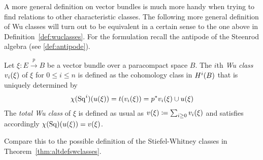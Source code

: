 A more general definition on vector bundles is much more handy when
trying to find relations to other characteristic classes.
The following more general definition of Wu classes
will turn out to be equivalent in a certain sense to the one above in
Definition~\autoref{def:wuclasses}.
For the formulation recall the antipode of the Steenrod algebra
(see \autoref{def:antipode}).
\begin{Def}\label{def:altwuclasses}
  Let $\xi\colon E\xrightarrow{p} B$ be a vector bundle over a
  paracompact space $B$.
  The $i$th \emph{Wu class} ${v_{i}}(\xi)$ of $\xi$ for $0\leq i\leq n$
  is defined as the cohomology class in $H^i(B)$ that is uniquely
  determined by
  \begin{gather*}
    \chi(\mathrm{Sq}^{i})({u}(\xi)) = t({v_{i}}(\xi)) = {p}^* {v_{i}}(\xi) \cup {u}(\xi)
  \end{gather*}
  The \emph{total Wu class} of $\xi$ is defined as usual as
  ${v}(\xi)\coloneqq\sum_{i\geq0}{v_{i}}(\xi)$ and satisfies accordingly 
  $\chi(\mathrm{Sq})({u}(\xi))={v}(\xi)$.
\end{Def}
\begin{Rem}
  Compare this to the possible definition of the Stiefel-Whitney
  classes in Theorem~\autoref{thm:altdefswclasses}.
\end{Rem}

